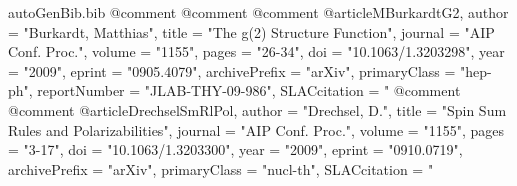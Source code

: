 \begin{filecontents*}{autoGenBib.bib}
@comment %
@comment %
@comment %
@article{MBurkardtG2,
      author         = "Burkardt, Matthias",
      title          = "{The g(2) Structure Function}",
      journal        = "AIP Conf. Proc.",
      volume         = "1155",
      pages          = "26-34",
      doi            = "10.1063/1.3203298",
      year           = "2009",
      eprint         = "0905.4079",
      archivePrefix  = "arXiv",
      primaryClass   = "hep-ph",
      reportNumber   = "JLAB-THY-09-986",
      SLACcitation   = "%
}
@comment %
@comment %
@article{DrechselSmRlPol,
      author         = "Drechsel, D.",
      title          = "{Spin Sum Rules and Polarizabilities}",
      journal        = "AIP Conf. Proc.",
      volume         = "1155",
      pages          = "3-17",
      doi            = "10.1063/1.3203300",
      year           = "2009",
      eprint         = "0910.0719",
      archivePrefix  = "arXiv",
      primaryClass   = "nucl-th",
      SLACcitation   = "%
}


\end{filecontents*}
